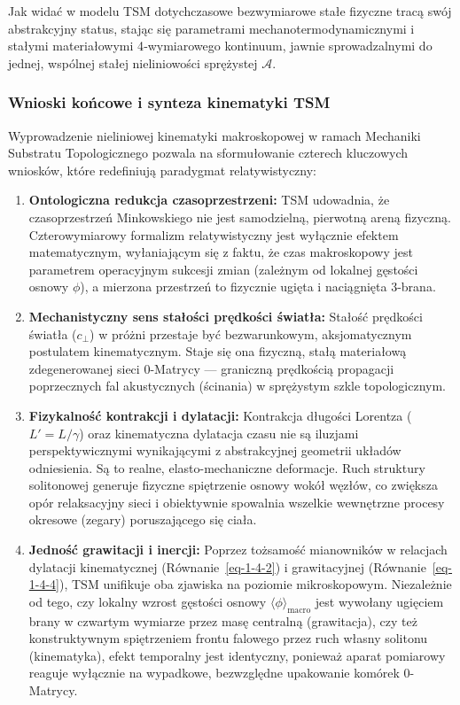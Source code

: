 \documentclass[
  polish,
  letterpaper,
  DIV=11,
  numbers=noendperiod,
  oneside]{scrartcl}
\providecommand{\tightlist}{%
  \setlength{\itemsep}{0pt}\setlength{\parskip}{0pt}}
\begin{document}
Jak widać w modelu TSM dotychczasowe bezwymiarowe stałe fizyczne tracą
swój abstrakcyjny status, stając się parametrami
mechanotermodynamicznymi i stałymi materiałowymi 4‑wymiarowego
kontinuum, jawnie sprowadzalnymi do jednej, wspólnej stałej
nieliniowości sprężystej \(\mathcal{A}\).

\subsubsection{Wnioski końcowe i synteza kinematyki
TSM}\label{sec-1-4-6}

Wyprowadzenie nieliniowej kinematyki makroskopowej w ramach Mechaniki
Substratu Topologicznego pozwala na sformułowanie czterech kluczowych
wniosków, które redefiniują paradygmat relatywistyczny:

\begin{enumerate}
\def\labelenumi{\arabic{enumi}.}
\tightlist
\item
  \textbf{Ontologiczna redukcja czasoprzestrzeni:} TSM udowadnia, że
  czasoprzestrzeń Minkowskiego nie jest samodzielną, pierwotną areną
  fizyczną. Czterowymiarowy formalizm relatywistyczny jest wyłącznie
  efektem matematycznym, wyłaniającym się z faktu, że czas makroskopowy
  jest parametrem operacyjnym sukcesji zmian (zależnym od lokalnej
  gęstości osnowy \(\phi\)), a mierzona przestrzeń to fizycznie ugięta i
  naciągnięta 3-brana.
\item
  \textbf{Mechanistyczny sens stałości prędkości światła:} Stałość
  prędkości światła (\(c_{\perp}\)) w próżni przestaje być
  bezwarunkowym, aksjomatycznym postulatem kinematycznym. Staje się ona
  fizyczną, stałą materiałową zdegenerowanej sieci 0-Matrycy ---
  graniczną prędkością propagacji poprzecznych fal akustycznych
  (ścinania) w sprężystym szkle topologicznym.
\item
  \textbf{Fizykalność kontrakcji i dylatacji:} Kontrakcja długości
  Lorentza (\(L'=L/\gamma\)) oraz kinematyczna dylatacja czasu nie są
  iluzjami perspektywicznymi wynikającymi z abstrakcyjnej geometrii
  układów odniesienia. Są to realne, elasto-mechaniczne deformacje. Ruch
  struktury solitonowej generuje fizyczne spiętrzenie osnowy wokół
  węzłów, co zwiększa opór relaksacyjny sieci i obiektywnie spowalnia
  wszelkie wewnętrzne procesy okresowe (zegary) poruszającego się ciała.
\item
  \textbf{Jedność grawitacji i inercji:} Poprzez tożsamość mianowników w
  relacjach dylatacji kinematycznej (Równanie~\ref{eq-1-4-2}) i
  grawitacyjnej (Równanie~\ref{eq-1-4-4}), TSM unifikuje oba zjawiska na
  poziomie mikroskopowym. Niezależnie od tego, czy lokalny wzrost
  gęstości osnowy \(\langle\phi\rangle_{\text{macro}}\) jest wywołany
  ugięciem brany w czwartym wymiarze przez masę centralną (grawitacja),
  czy też konstruktywnym spiętrzeniem frontu falowego przez ruch własny
  solitonu (kinematyka), efekt temporalny jest identyczny, ponieważ
  aparat pomiarowy reaguje wyłącznie na wypadkowe, bezwzględne
  upakowanie komórek 0-Matrycy.
\end{enumerate}
\end{document}
